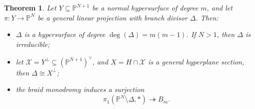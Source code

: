 \documentclass[12pt]{amsart}
\newtheorem{theorem}{Theorem}[section]
\newtheorem{corollary}[theorem]{Corollary}
\begin{document}


\begin{theorem}\label{intro_thm_pi1}
Let $Y\subseteq \mathbb P^{N+1}$ be a normal hypersurface of degree $m$, and let
$\pi:Y\to \mathbb P^N$ be a general linear projection with branch divisor $\Delta$.
Then:
\begin{itemize}
    \item $\Delta$ is a hypersurface of degree $\deg(\Delta)=m(m-1)$. If $N>1$, then $\Delta$ is irreducible;
    
    \item let $\mathcal X=Y^\perp\subseteq (\mathbb P^{N+1})^\vee$, 
    and $X=H\cap \mathcal X$ is a general hyperplane section, then $\Delta \cong X^\perp$;

    \item the braid monodromy induces a surjection
  \begin{equation}\label{intro_eqn_surj-pi1}
        \pi_1(\mathbb P^N\setminus \Delta,*)\twoheadrightarrow B_m.
    \end{equation} 
\end{itemize}
\end{theorem}

 
\end{document}
